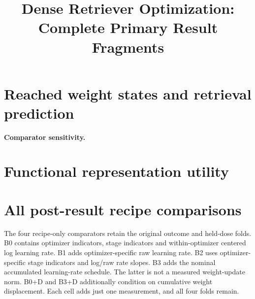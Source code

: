 \documentclass[10pt,twocolumn]{article}
\title{Dense Retriever Optimization: Complete Primary Result Fragments}
\author{}
\date{}
\begin{document}
\maketitle
\CorrectedMainSection
\section{Reached weight states and retrieval prediction}
\CorrectedWeightSpaceFinding

\CorrectedGeometryBridgeFinding

\paragraph{Comparator sensitivity.}
\RecipeSensitivityFinding
\CorrectedGeometryBridgeTable
\section{Functional representation utility}
\DimensionUtilizationFinding

\DimensionRetrievalBridgeFinding

\DimensionConclusionFinding
\DimensionUtilizationFigure
\DimensionUtilizationAppendixTable
\clearpage
\section{All post-result recipe comparisons}
The four recipe-only comparators retain the original outcome and held-dose
folds. B0 contains optimizer indicators, stage indicators and within-optimizer
centered log learning rate. B1 adds optimizer-specific raw learning rate.
B2 uses optimizer-specific stage indicators and log/raw rate slopes. B3 adds
the nominal accumulated learning-rate schedule. The latter is not a measured
weight-update norm. B0+D and B3+D additionally condition on cumulative weight
displacement. Each cell adds just one measurement, and all four folds remain.
\WeightRecipeSensitivityTable
\FunctionalRecipeSensitivityTable
\clearpage
\end{document}
